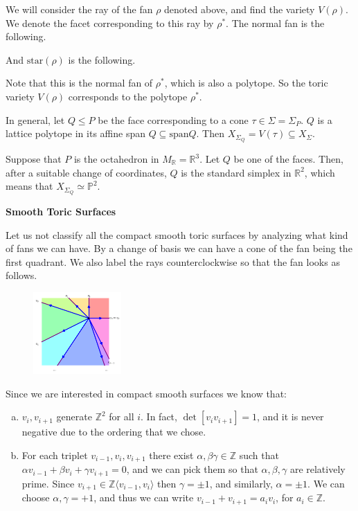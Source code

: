 \documentclass[a4paper,12pt]{amsart}
\newcommand{\ZZ}{\mathbb{Z}}
\newcommand{\RR}{\mathbb{R}}
\newcommand{\PP}{\mathbb{P}}
\begin{document}
We will consider the ray of the fan $\rho$ denoted above, and find the variety $V(\rho)$. We denote the facet corresponding to this ray by $\rho^*$. The normal fan is the following.

And $\text{star}(\rho)$ is the following.

Note that this is the normal fan of $\rho^*$, which is also a polytope. So the toric variety $V(\rho)$ corresponds to the polytope $\rho^*$.

In general, let $Q\leq P$ be the face corresponding to a cone $\tau\in\Sigma=\Sigma_P$. $Q$ is a lattice polytope in its affine span $Q\subseteq\text{span} Q$. Then $X_{\Sigma_Q}=V(\tau)\subseteq X_\Sigma$.

\begin{example}
	Suppose that $P$ is the octahedron in $M_\RR=\RR^3$. Let $Q$ be one of the faces. Then, after a suitable change of coordinates, $Q$ is the standard simplex in $\RR^2$, which means that $X_{\Sigma_Q}\simeq\PP^2$.
\end{example}

\noindent\textbf{Smooth Toric Surfaces}

Let us not classify all the compact smooth toric surfaces by analyzing what kind of fans we can have. By a change of basis we can have a cone of the fan being the first quadrant. We also label the rays counterclockwise so that the fan looks as follows.

\begin{figure}[h]
	\centering
	\includegraphics[width=0.3\textwidth]{pic/Mar21_fan3}
\end{figure}

Since we are interested in compact smooth surfaces we know that:
\begin{enumerate}[(a)]
	\item $v_i,v_{i+1}$ generate $\ZZ^2$ for all $i$. In fact, $\det[v_i v_{i+1}]=1$, and it is never negative due to the ordering that we chose.
	\item For each triplet $v_{i-1},v_i,v_{i+1}$ there exist $\alpha,\beta\gamma\in\ZZ$ such that $\alpha v_{i-1}+\beta v_i+\gamma v_{i+1}=0$, and we can pick them so that $\alpha,\beta,\gamma$ are relatively prime. Since $v_{i+1}\in\ZZ\langle v_{i-1},v_i\rangle$ then $\gamma=\pm 1$, and similarly, $\alpha=\pm 1$. We can choose $\alpha,\gamma=+1$, and thus we can write $v_{i-1}+v_{i+1}=a_i v_i$, for $a_i\in\ZZ$.
\end{enumerate}
\end{document}
